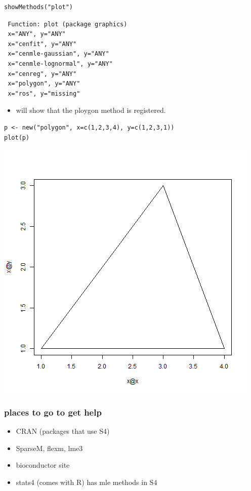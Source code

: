 \documentclass[11pt]{article}
\begin{document}
\begin{itemize}
\begin{verbatim}
showMethods("plot")
\end{verbatim}

\begin{verbatim}
 Function: plot (package graphics)
 x="ANY", y="ANY"
 x="cenfit", y="ANY"
 x="cenmle-gaussian", y="ANY"
 x="cenmle-lognormal", y="ANY"
 x="cenreg", y="ANY"
 x="polygon", y="ANY"
 x="ros", y="missing"
\end{verbatim}

\begin{itemize}
\item will show that the ploygon method is registered.
\end{itemize}


\begin{verbatim}
p <- new("polygon", x=c(1,2,3,4), y=c(1,2,3,1))
plot(p)
\end{verbatim}

\includegraphics[width=.9\linewidth]{poly.png}

\end{itemize} %
\subsubsection{places to go to get help}
\label{sec-4-3-10}

\begin{itemize}
\item CRAN (packages that use S4)
\item SparseM, flexm, lme3
\item bioconductor site
\item stats4 (comes with R) has mle methods in S4
\end{itemize}
\end{document}
